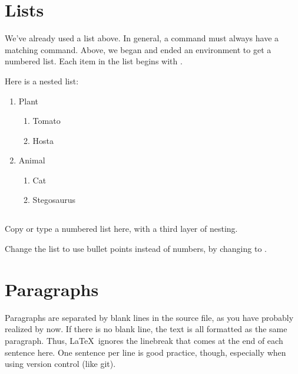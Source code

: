 \documentclass{article}
\begin{document}
\section{Lists}
\label{sec:lists}

We've already used a list above.
In general, a \latexcode{\\begin} command must always have a matching \latexcode{\\end} command.
Above, we began and ended an  environment to get a numbered list.
Each item in the list begins with \latexcode{\\item}.

Here is a nested list:
\begin{enumerate}
    \item Plant
    \begin{enumerate}
        \item Tomato
        \item Hosta
    \end{enumerate}
    \item Animal
    \begin{enumerate}
        \item Cat
        \item Stegosaurus
    \end{enumerate}
\end{enumerate}

\subsection{\task}

Copy or type a numbered list here, with a third layer of nesting.

Change the list to use bullet points instead of numbers, by changing  to .

\section{Paragraphs}
\label{sec:paragraphs}

Paragraphs are separated by blank lines in the source file, as you have probably realized by now.
If there is no blank line, the text is all formatted as the same paragraph.
Thus, \LaTeX\ ignores the linebreak that comes at the end of each sentence here.
One sentence per line is good practice, though, especially when using version control (like git).
\end{document}
